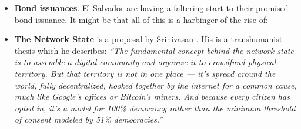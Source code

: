 \begin{itemize}
\item \textbf{Bond issuances}. El Salvador are having a \href{https://www.ft.com/content/4fa63c8c-51f5-4512-b522-76dd75e62916}{faltering start} to their promised bond issuance. It might be that all of this is a harbinger of the rise of: 
\item \textbf{The Network State} is a proposal by Srinivasan \cite{Srinivasan2022}. His is a transhumanist thesis which he describes: \textit{``The fundamental concept behind the network state is to assemble a digital community and organize it to crowdfund physical territory. But that territory is not in one place — it’s spread around the world, fully decentralized, hooked together by the internet for a common cause, much like Google’s offices or Bitcoin’s miners. And because every citizen has opted in, it’s a model for 100\% democracy rather than the minimum threshold of consent modeled by 51\% democracies.''}
\end{itemize}
